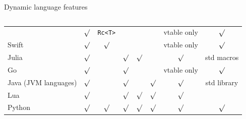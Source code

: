 \documentclass[aspectratio=169]{beamer}
\begin{document}
\begin{frame}{Dynamic language features}
\begin{columns}
\begin{center}
\begin{tabular}{l | c | c | c | c | c | c | c}
       & $\surd$  & {\small\texttt{Rc<T>}}         &         &         &         & vtable only  & $\surd$ \\
Swift                & $\surd$  & $\surd$                         &         &         &         & vtable only  & $\surd$     \\
Julia                & $\surd$  &                                 & $\surd$ & $\surd$ &         & $\surd$ & std macros  \\
Go                   & $\surd$  &                                 & $\surd$ &         &         & vtable only  & $\surd$     \\
Java (JVM languages) & $\surd$  &                                 & $\surd$ &         & $\surd$ & $\surd$ & std library \\
Lua                  & $\surd$  &                                 & $\surd$ & $\surd$ & $\surd$ & $\surd$ &             \\
Python               & $\surd$  & $\surd$                         & $\surd$ & $\surd$ & $\surd$ & $\surd$ & $\surd$     \\
\end{tabular}
\end{center}
\end{columns}
\end{frame}
\end{document}

